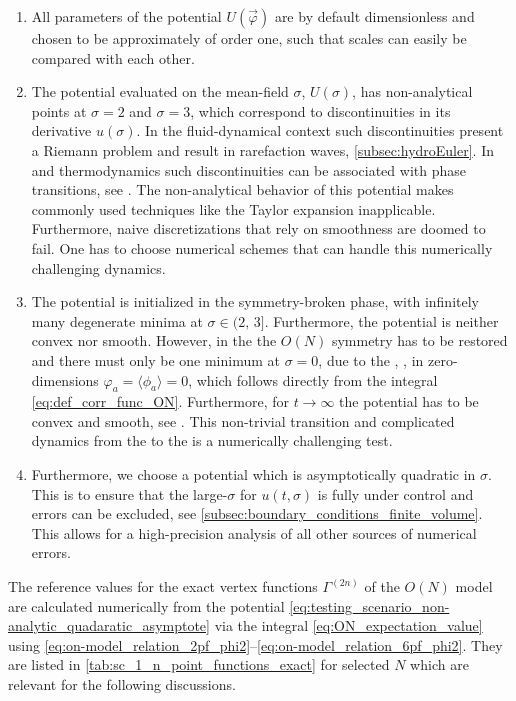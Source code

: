 \begin{enumerate}
	\item	All parameters of the potential $U ( \vec{\varphi} )$ are by default dimensionless and chosen to be approximately of order one, such that scales can easily be compared with each other.
	
	\item	The \uv{} potential evaluated on the mean-field $\sigma$, $U ( \sigma )$, has non-analytical points at $\sigma = 2$ and $\sigma = 3$, which correspond to discontinuities in its derivative $u ( \sigma )$.
	In the fluid-dynamical context such discontinuities present a Riemann problem and result in rarefaction waves, \cf{} \cref{subsec:hydroEuler}.
	In \qft{} and thermodynamics such discontinuities can be associated with phase 	transitions, see \MWApp{}.
	The non-analytical behavior of this potential makes commonly used techniques like the \frg{} Taylor expansion inapplicable.
	Furthermore, naive discretizations that rely on smoothness are doomed to fail.
	One has to choose numerical schemes that can handle this numerically challenging dynamics.
	
	\item	The potential is initialized in the symmetry-broken phase, with infinitely many degenerate minima at $\sigma \in ( 2, \, 3]$.
	Furthermore, the \uv{} potential is neither convex nor smooth.
	However, in the \ir{} the $O(N)$ symmetry has to be restored and there must only be one minimum at $\sigma = 0$, due to the \cmwhTheorem{}, \ie{}, in zero-dimensions $\varphi_a = \langle \phi_a \rangle = 0$, which follows directly from the integral \eqref{eq:def_corr_func_ON}.
	Furthermore, for $t \rightarrow \infty$ the potential has to be convex and smooth, see \MWApp{}.
	This non-trivial transition and complicated dynamics from the \uv{} to the \ir{} is a numerically challenging test.
	
	\item	Furthermore, we choose a potential which is asymptotically quadratic in $\sigma$.
	This is to ensure that the large-$\sigma$ \bc{} for $u ( t, \sigma )$ is fully under control and errors can be excluded, see \cref{subsec:boundary_conditions_finite_volume}. 
	This allows for a high-precision analysis of all other sources of numerical errors.
\end{enumerate}
The reference values for the exact \ir{} \ipi{} vertex functions $\Gamma^{(2n)}$ of the $O(N)$ model are calculated numerically from the \uv{} potential \eqref{eq:testing_scenario_non-analytic_quadaratic_asymptote} via the integral \eqref{eq:ON_expectation_value} using \cref{eq:on-model_relation_2pf_phi2}\nolinebreak[3]--\nolinebreak[2]\eqref{eq:on-model_relation_6pf_phi2}.
They are listed in \cref{tab:sc_1_n_point_functions_exact} for selected $N$ which are relevant for the following discussions.

